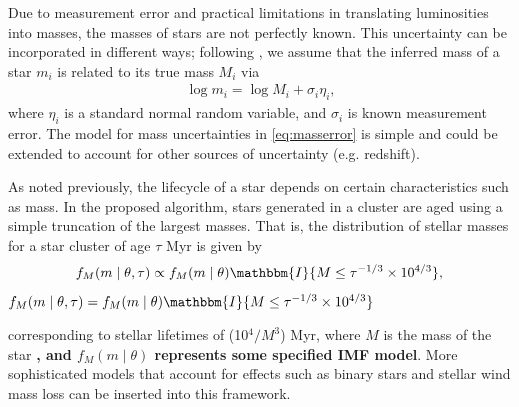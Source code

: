 \documentclass[ejs]{imsart}
\numberwithin{equation}{section}
\theoremstyle{plain}
\newcommand{\new}[1]{{\bf #1}}
\newcommand{\remove}[1]{\st{#1}}
\newcommand{\indic}{\mathbbm{I}}
\begin{document}
Due to measurement error and practical limitations in translating luminosities into masses, the masses of stars are not perfectly known. 
This uncertainty can be incorporated in different ways; following \cite{weisz13}, we assume that the inferred mass of a star $m_i$ is related to its true mass $M_i$ via 
\begin{align}
	\log m_i = \log M_i + \sigma_i \eta_i \text{,}
	\label{eq:masserror}
\end{align}
where $\eta_i$ is a standard normal random variable, and $\sigma_i$ is known measurement error.   %
The model for mass uncertainties in \eqref{eq:masserror} is simple and could be extended to account for other sources of uncertainty (e.g. redshift).

As noted previously, the lifecycle of a star depends on certain characteristics such as mass.  In the proposed algorithm, stars generated in a cluster are aged using a simple truncation of the largest masses.  
That is, the distribution of stellar masses for a star cluster of age $\tau$ Myr is given by
	\begin{align}
	f_M(m \mid \theta, \tau) \propto f_M(m \mid \theta) \indic \{M \leq \tau^{-1/3} \times 10^{4/3}\} \text{,}
	\label{eq:age}
	\end{align}
\remove{$f_M(m \mid \theta, \tau) = f_M(m \mid \theta) \indic \{M \leq \tau^{-1/3} \times 10^{4/3}\}$}

\noindent corresponding to stellar lifetimes of (10$^4/M^{3}$) Myr, where $M$ is the mass of the star \citep{hansen2004, Chaisson:2011}\new{, and $f_M(m \mid \theta)$ represents some specified IMF model}. 
More sophisticated models that account for effects such as binary stars and stellar wind mass loss can be inserted into this framework.  



\end{document}
